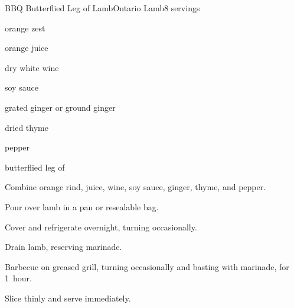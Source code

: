 \begin{recipe}{BBQ Butterflied Leg of Lamb}{Ontario Lamb}{8 servings}

\begin{ingredients}
\item {} orange zest
\item \C{\half} orange juice
\item \C{\half} dry white wine
\item \C{\quarter} soy sauce
\item {} grated ginger or  ground ginger
\item {} dried thyme
\item \tp{\quarter} pepper
\item {} butterflied leg of 
\end{ingredients}

\begin{directions}
\item Combine orange rind, juice, wine, soy sauce, ginger, thyme, and pepper.
\item Pour over lamb in a pan or resealable bag.
\item Cover and refrigerate overnight, turning occasionally.
\item Drain lamb, reserving marinade.
\item Barbecue on greased grill, turning occasionally and basting with marinade, for 1~hour.
\item Slice thinly and serve immediately.
\end{directions}

\end{recipe}
